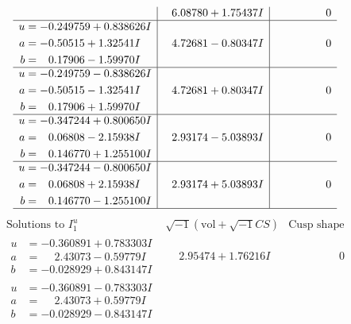\documentclass[1p]{elsarticle_modified}
\theoremstyle{definition}
\newcommand{\I}{\sqrt{-1}}
\begin{document}
$$\begin{array}{c|c|c}
 & \phantom{-}6.08780 + 1.75437 I & \phantom{-0.000000 } 0 \\ \hline\begin{aligned}
u &= -0.249759 + 0.838626 I \\
a &= -0.50515 + 1.32541 I \\
b &= \phantom{-}0.17906 - 1.59970 I\end{aligned}
 & \phantom{-}4.72681 - 0.80347 I & \phantom{-0.000000 } 0 \\ \hline\begin{aligned}
u &= -0.249759 - 0.838626 I \\
a &= -0.50515 - 1.32541 I \\
b &= \phantom{-}0.17906 + 1.59970 I\end{aligned}
 & \phantom{-}4.72681 + 0.80347 I & \phantom{-0.000000 } 0 \\ \hline\begin{aligned}
u &= -0.347244 + 0.800650 I \\
a &= \phantom{-}0.06808 - 2.15938 I \\
b &= \phantom{-}0.146770 + 1.255100 I\end{aligned}
 & \phantom{-}2.93174 - 5.03893 I & \phantom{-0.000000 } 0 \\ \hline\begin{aligned}
u &= -0.347244 - 0.800650 I \\
a &= \phantom{-}0.06808 + 2.15938 I \\
b &= \phantom{-}0.146770 - 1.255100 I\end{aligned}
 & \phantom{-}2.93174 + 5.03893 I & \phantom{-0.000000 } 0\\
 \hline 
 \end{array}$$\newpage$$\begin{array}{c|c|c}  
\text{Solutions to }I^u_{1}& \I (\text{vol} + \sqrt{-1}CS) & \text{Cusp shape}\\
 \hline 
\begin{aligned}
u &= -0.360891 + 0.783303 I \\
a &= \phantom{-}2.43073 - 0.59779 I \\
b &= -0.028929 + 0.843147 I\end{aligned}
 & \phantom{-}2.95474 + 1.76216 I & \phantom{-0.000000 } 0 \\ \hline\begin{aligned}
u &= -0.360891 - 0.783303 I \\
a &= \phantom{-}2.43073 + 0.59779 I \\
b &= -0.028929 - 0.843147 I\end{aligned}

\end{array}$$
\end{document}
